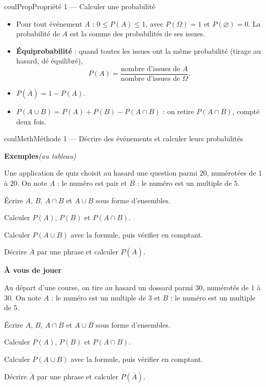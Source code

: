 \documentclass[11pt,a4paper]{article}
\makeatletter
\renewcommand{\le}{\leqslant}
\newcounter{lycee@signet}
\newcommand{\signet}[3][]{\stepcounter{lycee@signet}%
  \edef\lycee@dest{\if\relax\detokenize{#1}\relax
    signet.\arabic{lycee@signet}\else#1\fi}%
  \hypertarget{\lycee@dest}{}\bookmark[level=#2,dest=\lycee@dest]{#3}}
\newcounter{methode}
\newenvironment{proprietebox}[1][Propriété]%
  {\begin{boitecours}[phantom={\signet{2}{#1}}]{coulProp}{#1}}{\end{boitecours}}
\newenvironment{methodebox}[1][Méthode]{\stepcounter{methode}%
  \begin{boitecours}[phantom={\signet[methode-\arabic{methode}]{2}{#1}}]{coulMeth}{#1}}%
  {\end{boitecours}}
\newcommand{\etape}[1]{\par\smallskip\textbf{\color{coulMeth}#1}\par\nobreak\smallskip}
\newcommand{\autableau}{\hfill{\footnotesize\itshape\color{black!45}(au tableau)}}
\newcommand{\etapeexemples}{%
    \par\smallskip\textbf{\color{coulMeth}Exemples}\autableau\par\nobreak\smallskip}
\makeatother
\begin{document}
\begin{proprietebox}[Propriété 1 --- Calculer une probabilité]
\begin{itemize}
  \item Pour tout événement $A$ : $0\le P(A)\le 1$, avec $P(\Omega)=1$ et
    $P(\varnothing)=0$. La probabilité de $A$ est la somme des probabilités de ses issues.
  \item \textbf{Équiprobabilité} : quand toutes les issues ont la même probabilité
    (tirage \og au hasard\fg, dé équilibré),
    \[
      P(A)=\frac{\text{nombre d'issues de }A}{\text{nombre d'issues de }\Omega}.
    \]
  \item $P(\overline{A})=1-P(A)$.
  \item $P(A\cup B)=P(A)+P(B)-P(A\cap B)$ : on retire $P(A\cap B)$, compté deux fois.
\end{itemize}
\end{proprietebox}

\begin{methodebox}[Méthode 1 --- Décrire des événements et calculer leurs probabilités]
\etapeexemples
Une application de quiz choisit au hasard une question parmi $20$, numérotées de $1$
à $20$. On note $A$ : \og le numéro est pair\fg{} et $B$ : \og le numéro est un multiple
de $5$\fg.
\begin{questions}[label=\alph*)]
  \item Écrire $A$, $B$, $A\cap B$ et $A\cup B$ sous forme d'ensembles.
  \item Calculer $P(A)$, $P(B)$ et $P(A\cap B)$.
  \item Calculer $P(A\cup B)$ avec la formule, puis vérifier en comptant.
  \item Décrire $\overline{A}$ par une phrase et calculer $P(\overline{A})$.
\end{questions}

\etape{À vous de jouer}
Au départ d'une course, on tire au hasard un dossard parmi $30$, numérotés de $1$ à
$30$. On note $A$ : \og le numéro est un multiple de $3$\fg{} et $B$ : \og le numéro
est un multiple de $5$\fg.
\begin{questions}[label=\alph*)]
  \item Écrire $A$, $B$, $A\cap B$ et $A\cup B$ sous forme d'ensembles.
  \item Calculer $P(A)$, $P(B)$ et $P(A\cap B)$.
  \item Calculer $P(A\cup B)$ avec la formule, puis vérifier en comptant.
  \item Décrire $\overline{A}$ par une phrase et calculer $P(\overline{A})$.
\end{questions}

\end{methodebox}
\end{document}
